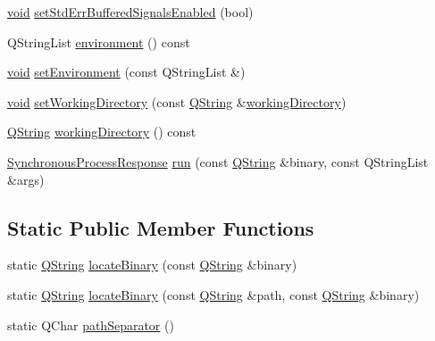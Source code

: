 \begin{DoxyCompactItemize}
\item 
\hyperlink{group___u_a_v_objects_plugin_ga444cf2ff3f0ecbe028adce838d373f5c}{void} \hyperlink{class_utils_1_1_synchronous_process_a2266d1d25c1c56259843580ec8ac8bc2}{set\-Std\-Err\-Buffered\-Signals\-Enabled} (bool)
\item 
\-Q\-String\-List \hyperlink{class_utils_1_1_synchronous_process_a1954e54fe53020fc0ef8d9d7c622c872}{environment} () const 
\item 
\hyperlink{group___u_a_v_objects_plugin_ga444cf2ff3f0ecbe028adce838d373f5c}{void} \hyperlink{class_utils_1_1_synchronous_process_aadedd5baae795c6f5f866f0ca1b08574}{set\-Environment} (const \-Q\-String\-List \&)
\item 
\hyperlink{group___u_a_v_objects_plugin_ga444cf2ff3f0ecbe028adce838d373f5c}{void} \hyperlink{class_utils_1_1_synchronous_process_aa174d043ac6c3aa21358858e13d46a2c}{set\-Working\-Directory} (const \hyperlink{group___u_a_v_objects_plugin_gab9d252f49c333c94a72f97ce3105a32d}{\-Q\-String} \&\hyperlink{class_utils_1_1_synchronous_process_a736699b179a07d0e04ccc6cdeef7f55f}{working\-Directory})
\item 
\hyperlink{group___u_a_v_objects_plugin_gab9d252f49c333c94a72f97ce3105a32d}{\-Q\-String} \hyperlink{class_utils_1_1_synchronous_process_a736699b179a07d0e04ccc6cdeef7f55f}{working\-Directory} () const 
\item 
\hyperlink{struct_utils_1_1_synchronous_process_response}{\-Synchronous\-Process\-Response} \hyperlink{class_utils_1_1_synchronous_process_a37f589d3b02afb7d8f14ee1f8cb11e24}{run} (const \hyperlink{group___u_a_v_objects_plugin_gab9d252f49c333c94a72f97ce3105a32d}{\-Q\-String} \&binary, const \-Q\-String\-List \&args)
\end{DoxyCompactItemize}
\subsection*{\-Static \-Public \-Member \-Functions}
\begin{DoxyCompactItemize}
\item 
static \hyperlink{group___u_a_v_objects_plugin_gab9d252f49c333c94a72f97ce3105a32d}{\-Q\-String} \hyperlink{class_utils_1_1_synchronous_process_aa16c0d57a35c3526cd891529c079e8eb}{locate\-Binary} (const \hyperlink{group___u_a_v_objects_plugin_gab9d252f49c333c94a72f97ce3105a32d}{\-Q\-String} \&binary)
\item 
static \hyperlink{group___u_a_v_objects_plugin_gab9d252f49c333c94a72f97ce3105a32d}{\-Q\-String} \hyperlink{class_utils_1_1_synchronous_process_a1a1fb07186fc812eeb0e8624ad2d1d35}{locate\-Binary} (const \hyperlink{group___u_a_v_objects_plugin_gab9d252f49c333c94a72f97ce3105a32d}{\-Q\-String} \&path, const \hyperlink{group___u_a_v_objects_plugin_gab9d252f49c333c94a72f97ce3105a32d}{\-Q\-String} \&binary)
\item 
static \-Q\-Char \hyperlink{class_utils_1_1_synchronous_process_adc0ff980620acd3fbbea36bdb998c406}{path\-Separator} ()
\end{DoxyCompactItemize}


